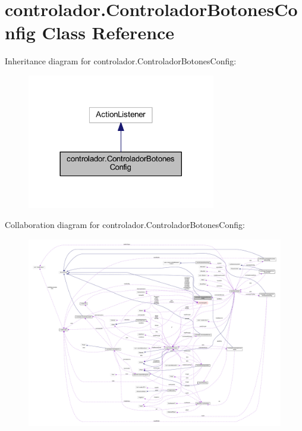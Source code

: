 \hypertarget{classcontrolador_1_1_controlador_botones_config}{}\section{controlador.\+Controlador\+Botones\+Config Class Reference}
\label{classcontrolador_1_1_controlador_botones_config}


Inheritance diagram for controlador.\+Controlador\+Botones\+Config\+:
\nopagebreak
\begin{figure}[H]
\begin{center}
\leavevmode
\includegraphics[width=233pt]{classcontrolador_1_1_controlador_botones_config__inherit__graph}
\end{center}
\end{figure}


Collaboration diagram for controlador.\+Controlador\+Botones\+Config\+:
\nopagebreak
\begin{figure}[H]
\begin{center}
\leavevmode
\includegraphics[width=350pt]{classcontrolador_1_1_controlador_botones_config__coll__graph}
\end{center}
\end{figure}
